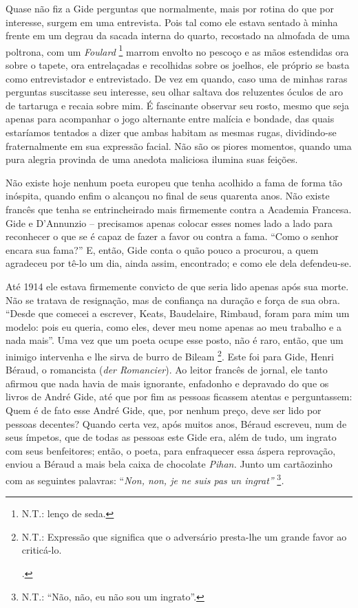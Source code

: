 Quase não fiz a Gide perguntas que normalmente, mais por rotina do que
por interesse, surgem em uma entrevista. Pois tal como ele estava
sentado à minha frente em um degrau da sacada interna do quarto,
recostado na almofada de uma poltrona, com um \emph{Foulard} \footnote{N.T.:
  lenço de seda.} marrom envolto no pescoço e as mãos estendidas ora
sobre o tapete, ora entrelaçadas e recolhidas sobre os joelhos, ele
próprio se basta como entrevistador e entrevistado\emph{.} De vez em
quando, caso uma de minhas raras perguntas suscitasse seu interesse, seu
olhar saltava dos reluzentes óculos de aro de tartaruga e recaia sobre
mim. É fascinante observar seu rosto, mesmo que seja apenas para
acompanhar o jogo alternante entre malícia e bondade, das quais
estaríamos tentados a dizer que ambas habitam as mesmas rugas,
dividindo-se fraternalmente em sua expressão facial. Não são os piores
momentos, quando uma pura alegria provinda de uma anedota maliciosa
ilumina suas feições.

Não existe hoje nenhum poeta europeu que tenha acolhido a fama de forma
tão inóspita, quando enfim o alcançou no final de seus quarenta anos.
Não existe francês que tenha se entrincheirado mais firmemente contra a
Academia Francesa. Gide e D'Annunzio -- precisamos apenas colocar esses
nomes lado a lado para reconhecer o que se é capaz de fazer a favor ou
contra a fama. ``Como o senhor encara sua fama?'' E, então, Gide conta o
quão pouco a procurou, a quem agradeceu por tê-lo um dia, ainda assim,
encontrado; e como ele dela defendeu-se.

Até 1914 ele estava firmemente convicto de que seria lido apenas após
sua morte. Não se tratava de resignação, mas de confiança na duração e
força de sua obra. ``Desde que comecei a escrever, Keats, Baudelaire,
Rimbaud, foram para mim um modelo: pois eu queria, como eles, dever meu
nome apenas ao meu trabalho e a nada mais''. Uma vez que um poeta ocupe
esse posto, não é raro, então, que um inimigo intervenha e lhe sirva de
burro de Bileam \footnote{N.T.: Expressão que significa que o adversário
  presta-lhe um grande favor ao criticá-lo.

  .}. Este foi para Gide, Henri Béraud, o romancista (\emph{der
Romancier}). Ao leitor francês de jornal, ele tanto afirmou que nada
havia de mais ignorante, enfadonho e depravado do que os livros de André
Gide, até que por fim as pessoas ficassem atentas e perguntassem: Quem é
de fato esse André Gide, que, por nenhum preço, deve ser lido por
pessoas decentes? Quando certa vez, após muitos anos, Béraud escreveu,
num de seus ímpetos, que de todas as pessoas este Gide era, além de
tudo, um ingrato com seus benfeitores; então, o poeta, para enfraquecer
essa áspera reprovação, enviou a Béraud a mais bela caixa de chocolate
\emph{Pihan.} Junto um cartãozinho com as seguintes palavras:
``\emph{Non, non, je ne suis pas un ingrat''} \footnote{N.T.: ``Não,
  não, eu não sou um ingrato''.}\emph{. }

